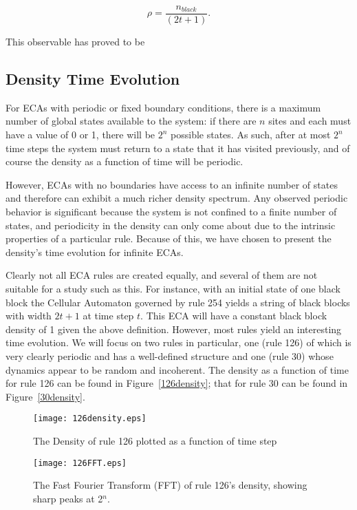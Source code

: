 \begin{equation}
    \rho = \frac{n_{black}}{(2t+1)}.
\end{equation}

This observable has proved to be 


\subsection{Density Time Evolution}
For ECAs with periodic or fixed boundary conditions, there is a
maximum number of global states available to the system: if there are
$n$ sites and each must have a value of 0 or 1, there will be $2^n$
possible states.
As such, after at most $2^n$ time steps the system must return to
a state that it has visited previously, and of course the density as a
function of time will be periodic.

However, ECAs with no boundaries have access to an infinite number of
states and therefore can exhibit a much richer density spectrum.
Any observed periodic behavior is significant because the system is
not confined to a finite number of states, and periodicity in the
density can only come about due to the intrinsic properties of a
particular rule.
Because of this, we have chosen to present the density's time
evolution for infinite ECAs.

Clearly not all ECA rules are created equally, and several of them are
not suitable for a study such as this.
For instance, with an initial state of one black block the Cellular
Automaton governed by rule 254 yields a string of black blocks with
width $2t+1$ at time step $t$.
This ECA will have a constant black block density of 1 given the above
definition.
However, most rules yield an interesting time evolution.
We will focus on two rules in particular, one (rule 126) of which is
very clearly periodic and has a well-defined structure and one (rule
30) whose dynamics appear to be random and incoherent.
The density as a function of time for rule 126 can be found in
Figure~\ref{126density}; that for rule 30 can be found in
Figure~\ref{30density}.


\begin{figure}
    \begin{minipage}[b]{0.49\textwidth}
        \centering
        \texttt{[image: 126density.eps]}
        \caption{\label{126density} The Density of rule 126 plotted as a function of time step}
    \end{minipage}
    \hspace{0.5cm}
    \begin{minipage}[b]{0.49\textwidth}
        \centering
        \texttt{[image: 126FFT.eps]}
        \caption{\label{126FFT} The Fast Fourier Transform (FFT) of
        rule 126's density, showing sharp peaks at 2$^n$.}
    \end{minipage}
\end{figure}


